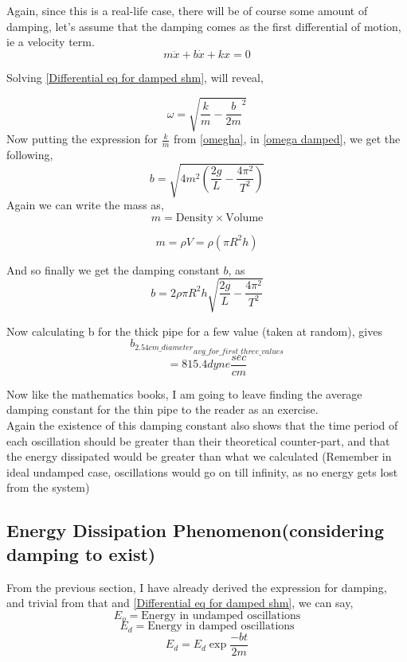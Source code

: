 \documentclass[twocolumn,11pt]{article}
\begin{document}
Again, since this is a real-life case, there will be of course some amount of damping, let's assume that the damping comes as the first differential of motion, ie a velocity term. 
\begin{equation}
    \label{Differential eq for damped shm}
    m\ddot x +b \dot x + kx = 0
\end{equation}

Solving \eqref{Differential eq for damped shm}, will reveal,

\begin{equation}
    \label{omega damped}
    \omega = \sqrt{\frac{k}{m}-\frac{b}{2m}^2}
\end{equation}
Now putting the expression for $\frac{k}{m}$ from \eqref{omegha}, in \eqref{omega damped}, we get the following,
$$b = \sqrt{4m^2(\frac{2g}{L}-\frac{4\pi^2}{T^2})}$$
Again we can write the mass as,
$$m= \text{Density}\times \text{Volume}$$

$$m = \rho V = \rho (\pi R^2 h)$$

And so finally we get the damping constant $b$, as
\begin{equation}
    \label{damping constant}
    b = 2\rho \pi R^2 h \sqrt{\frac{2g}{L}-\frac{4\pi^2}{T^2}}
\end{equation}

Now calculating b for the thick pipe for a few value (taken at random), gives
$${b_{2.54cm\_diameter}}_{avg\_for\_first\_three\_values} $$$$= 815.4 dyne\frac{sec}{cm}$$

Now like the mathematics books, I am going to leave finding the average damping constant for the thin pipe to the reader as an exercise. 
\\
Again the existence of this damping constant also shows that the time period of each oscillation should be greater than their theoretical counter-part, and that the energy dissipated would be greater than what we calculated (Remember in ideal undamped case, oscillations would go on till infinity, as no energy gets lost from the system) 

\subsection{Energy Dissipation Phenomenon(considering damping to exist)}
From the previous section, I have already derived the expression for damping, and trivial from that and \eqref{Differential eq for damped shm}, we can say,
$$E_o = \text{Energy in undamped oscillations}$$
$$E_d = \text{Energy in damped oscillations}$$
\begin{equation}
    \label{energy ini damping}
    E_d = E_d \exp{\frac{-bt}{2m}}
    \end{equation}
\end{document}
